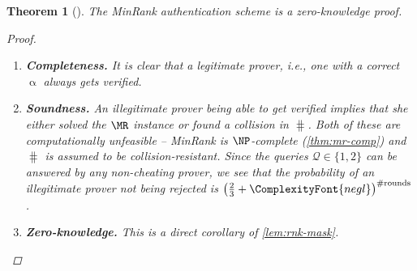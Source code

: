 \documentclass{article}
\theoremstyle{remark}
\theoremstyle{definition}
\theoremstyle{plain}
\newtheorem{theorem}{Theorem}
\renewcommand*{\vec}[1]{\bm{\mathrm{#1}}}
\begin{document}
\begin{theorem}[\autocite{Cou01}]\label{thm:mr-zk}
  The MinRank authentication scheme is a \emph{zero-knowledge proof}.
  \begin{proof}\leavevmode
    \begin{enumerate}
    \item \textbf{Completeness.} It is clear that a legitimate prover, i.e., one
      with a correct $\vec{\upalpha}$ always gets verified.
    \item \textbf{Soundness.} An illegitimate prover being able to get verified
      implies that she either solved the $\MR$ instance or found a collision in
      $\hash$.  Both of these are computationally unfeasible -- MinRank is
      $\NP$-complete (\cref{thm:mr-comp}) and $\hash$ is assumed to be
      collision-resistant. Since the queries $\mathcal{Q} \in \{1, 2\}$ can be
      answered by any non-cheating prover, we see that the probability of an
      illegitimate prover not being rejected is
      $\left(\frac 2 3 + \ComplexityFont{negl}\right)^{\#\text{rounds}}$.
    \item \textbf{Zero-knowledge.}  This is a direct corollary of
      \cref{lem:rnk-mask}.
    \end{enumerate}
  \end{proof}
\end{theorem}
\end{document}
